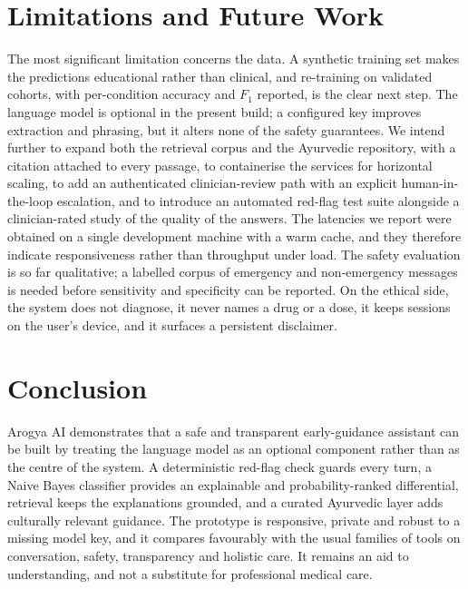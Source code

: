 \documentclass[conference]{IEEEtran}
\begin{document}
\section{Limitations and Future Work}

The most significant limitation concerns the data. A synthetic training set
makes the predictions educational rather than clinical, and re-training on
validated cohorts, with per-condition accuracy and $F_1$ reported, is the
clear next step. The language model is optional in the present build; a
configured key improves extraction and phrasing, but it alters none of the
safety guarantees. We intend further to expand both the retrieval corpus and
the Ayurvedic repository, with a citation attached to every passage, to
containerise the services for horizontal scaling, to add an authenticated
clinician-review path with an explicit human-in-the-loop escalation, and to
introduce an automated red-flag test suite alongside a clinician-rated study
of the quality of the answers. The latencies we report were obtained on a
single development machine with a warm cache, and they therefore indicate
responsiveness rather than throughput under load. The safety evaluation is so
far qualitative; a labelled corpus of emergency and non-emergency messages is
needed before sensitivity and specificity can be reported. On the ethical
side, the system does not diagnose, it never names a drug or a dose, it keeps
sessions on the user's device, and it surfaces a persistent disclaimer.

\section{Conclusion}

Arogya AI demonstrates that a safe and transparent early-guidance assistant
can be built by treating the language model as an optional component rather
than as the centre of the system. A deterministic red-flag check guards every
turn, a Naive Bayes classifier provides an explainable and probability-ranked
differential, retrieval keeps the explanations grounded, and a curated
Ayurvedic layer adds culturally relevant guidance. The prototype is
responsive, private and robust to a missing model key, and it compares
favourably with the usual families of tools on conversation, safety,
transparency and holistic care. It remains an aid to understanding, and not a
substitute for professional medical care.
\end{document}

